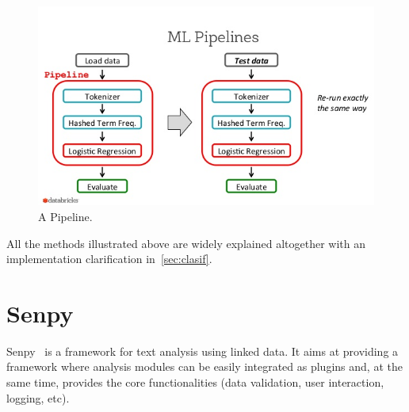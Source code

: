 \begin{figure}
	\centering
	\includegraphics[width=\linewidth]{img/pipeline1.png}
	\caption{A Pipeline.~\cite{pipeline}}
	\label{fig:pipeline}
\end{figure}

All the methods illustrated above are widely explained altogether with an implementation clarification in~\cref{sec:clasif}.
\section{Senpy}
Senpy~\cite{senpy} is a framework for text analysis using linked data. It aims at providing a framework where analysis modules can be easily integrated as plugins and, at the same time, provides the core functionalities (data validation, user interaction, logging, etc).

